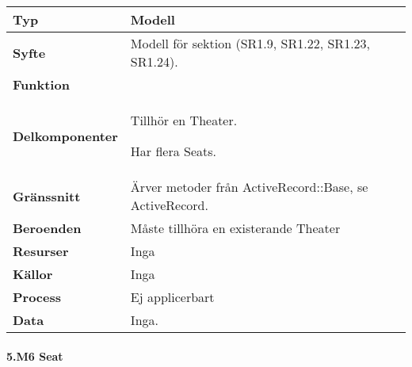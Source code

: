 \documentclass[a4paper, twoside, 11pt, titlepage]{article}
\begin{document}
			\begin {table} [ht] \begin{tabular} {  p{3.5cm} p{11.6cm} }
				\hline
				{\sffamily\textbf{Typ}} & {Modell} \\
				\hline
				{\sffamily\textbf{Syfte}} & {Modell för sektion (SR1.9, SR1.22, SR1.23, SR1.24).} \\
				\hline
				{\sffamily\textbf{Funktion}} & { } \\
				\hline
				{\sffamily\textbf{Delkomponenter}} & {Tillhör en Theater.

Har flera Seats.} \\
				\hline
				{\sffamily\textbf{Gränssnitt}} & {Ärver metoder från ActiveRecord::Base, se ActiveRecord.} \\
				\hline
				{\sffamily\textbf{Beroenden}} & {Måste tillhöra en existerande Theater} \\
				\hline
				{\sffamily\textbf{Resurser}} & {Inga} \\
				\hline
				{\sffamily\textbf{Källor}} & {Inga} \\
				\hline
				{\sffamily\textbf{Process}} & {Ej applicerbart} \\
				\hline
				{\sffamily\textbf{Data}} & {Inga.} \\
				\hline
			\end{tabular} \end{table} \FloatBarrier


			\clearpage %
			\paragraph{5.M6 Seat}\
\end{document}
